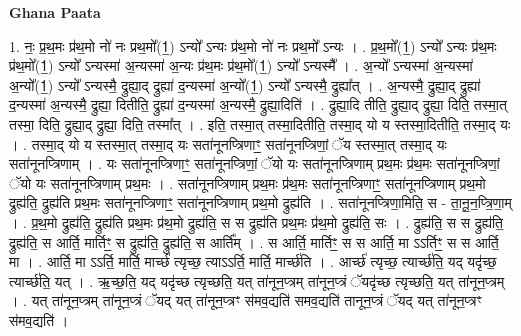 \documentclass[17pt]{extarticle}
\begin{document}
\textbf{Ghana Paata } \newline

1. नः॒ प्र॒थ॒मः प्र॑थ॒मो नो॑ नः प्रथ॒मो᳚(1॒) ऽन्यो᳚ ऽन्यः प्र॑थ॒मो नो॑ नः प्रथ॒मो᳚ ऽन्यः । . प्र॒थ॒मो᳚(1॒) ऽन्यो᳚ ऽन्यः प्र॑थ॒मः प्र॑थ॒मो᳚(1॒) ऽन्यो᳚ ऽन्यस्मा॑ अ॒न्यस्मा॑ अ॒न्यः प्र॑थ॒मः प्र॑थ॒मो᳚(1॒) ऽन्यो᳚ ऽन्यस्मै᳚ । . अ॒न्यो᳚ ऽन्यस्मा॑ अ॒न्यस्मा॑ अ॒न्यो᳚(1॒) ऽन्यो᳚ ऽन्यस्मै॒ द्रुह्या॒द् द्रुह्या॑ द॒न्यस्मा॑ अ॒न्यो᳚(1॒) ऽन्यो᳚ ऽन्यस्मै॒ द्रुह्या᳚त् । . अ॒न्यस्मै॒ द्रुह्या॒द् द्रुह्या॑ द॒न्यस्मा॑ अ॒न्यस्मै॒ द्रुह्या॒ दितीति॒ द्रुह्या॑ द॒न्यस्मा॑ अ॒न्यस्मै॒ द्रुह्या॒दिति॑ । . द्रुह्या॒दि तीति॒ द्रुह्या॒द् द्रुह्या॒ दिति॒ तस्मा॒त् तस्मा॒ दिति॒ द्रुह्या॒द् द्रुह्या॒ दिति॒ तस्मा᳚त् । . इति॒ तस्मा॒त् तस्मा॒दितीति॒ तस्मा॒द् यो य स्तस्मा॒दितीति॒ तस्मा॒द् यः । . तस्मा॒द् यो य स्तस्मा॒त् तस्मा॒द् यः सता॑नूनप्त्रिणाꣳ॒॒ सता॑नूनप्त्रिणां॒ ॅय स्तस्मा॒त् तस्मा॒द् यः सता॑नूनप्त्रिणाम् । . यः सता॑नूनप्त्रिणाꣳ॒॒ सता॑नूनप्त्रिणां॒ ॅयो यः सता॑नूनप्त्रिणाम् प्रथ॒मः प्र॑थ॒मः सता॑नूनप्त्रिणां॒ ॅयो यः सता॑नूनप्त्रिणाम् प्रथ॒मः । . सता॑नूनप्त्रिणाम् प्रथ॒मः प्र॑थ॒मः सता॑नूनप्त्रिणाꣳ॒॒ सता॑नूनप्त्रिणाम् प्रथ॒मो द्रुह्य॑ति॒ द्रुह्य॑ति प्रथ॒मः सता॑नूनप्त्रिणाꣳ॒॒ सता॑नूनप्त्रिणाम् प्रथ॒मो द्रुह्य॑ति । . सता॑नूनप्त्रिणा॒मिति॒ स - ता॒नू॒न॒प्त्रि॒णा॒म् । . प्र॒थ॒मो द्रुह्य॑ति॒ द्रुह्य॑ति प्रथ॒मः प्र॑थ॒मो द्रुह्य॑ति॒ स स द्रुह्य॑ति प्रथ॒मः प्र॑थ॒मो द्रुह्य॑ति॒ सः । . द्रुह्य॑ति॒ स स द्रुह्य॑ति॒ द्रुह्य॑ति॒ स आर्ति॒ मार्तिꣳ॒॒ स द्रुह्य॑ति॒ द्रुह्य॑ति॒ स आर्ति᳚म् । . स आर्ति॒ मार्तिꣳ॒॒ स स आर्ति॒ मा ऽऽर्तिꣳ॒॒ स स आर्ति॒ मा । . आर्ति॒ मा ऽऽर्ति॒ मार्ति॒ मार्च्छ॑ त्यृच्छ॒ त्याऽऽर्ति॒ मार्ति॒ मार्च्छ॑ति । . आर्च्छ॑ त्यृच्छ॒ त्यार्च्छ॑ति॒ यद् यदृ॑च्छ॒ त्यार्च्छ॑ति॒ यत् । . ऋ॒च्छ॒ति॒ यद् यदृ॑च्छ त्यृच्छति॒ यत् ता॑नून॒प्त्रम् ता॑नून॒प्त्रं ॅयदृ॑च्छ त्यृच्छति॒ यत् ता॑नून॒प्त्रम् । . यत् ता॑नून॒प्त्रम् ता॑नून॒प्त्रं ॅयद् यत् ता॑नून॒प्त्रꣳ स॑मव॒द्यति॑ समव॒द्यति॑ तानून॒प्त्रं ॅयद् यत् ता॑नून॒प्त्रꣳ स॑मव॒द्यति॑ । \newline
\end{document}
